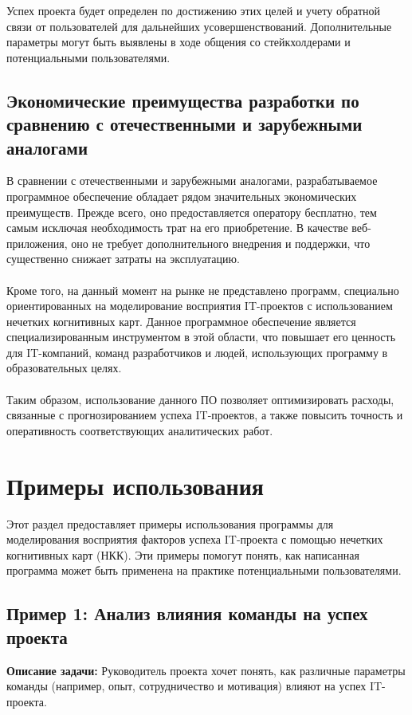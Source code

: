 \documentclass{article}
\begin{document}
    Успех проекта будет определен по достижению этих целей и учету обратной связи от пользователей для дальнейших усовершенствований. Дополнительные параметры могут быть выявлены в ходе общения со стейкхолдерами и потенциальными пользователями.
    \subsection {Экономические преимущества разработки по сравнению с отечественными и зарубежными аналогами}
    В сравнении с отечественными и зарубежными аналогами, разрабатываемое программное обеспечение обладает рядом значительных экономических преимуществ. Прежде всего, оно предоставляется оператору бесплатно, тем самым исключая необходимость трат на его приобретение. В качестве веб-приложения, оно не требует дополнительного внедрения и поддержки, что существенно снижает затраты на эксплуатацию.\\
    ~\\
    Кроме того, на данный момент на рынке не представлено программ, специально ориентированных на моделирование восприятия IT-проектов с использованием нечетких когнитивных карт. Данное программное обеспечение является специализированным инструментом в этой области, что повышает его ценность для IT-компаний, команд разработчиков и людей, использующих программу в образовательных целях.\\
    ~\\
    Таким образом, использование данного ПО позволяет оптимизировать расходы, связанные с прогнозированием успеха IT-проектов, а также повысить точность и оперативность соответствующих аналитических работ.

    \newpage
    \section{Примеры использования}

    Этот раздел предоставляет примеры использования программы для моделирования восприятия факторов успеха IT-проекта с помощью нечетких когнитивных карт (НКК). Эти примеры помогут понять, как написанная программа может быть применена на практике потенциальными пользователями.

    \subsection{Пример 1: Анализ влияния команды на успех проекта}

    \textbf{Описание задачи:} Руководитель проекта хочет понять, как различные параметры команды (например, опыт, сотрудничество и мотивация) влияют на успех IT-проекта.
\end{document}
